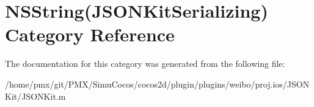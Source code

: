\hypertarget{categoryNSString_07JSONKitSerializing_08}{}\section{N\+S\+String(J\+S\+O\+N\+Kit\+Serializing) Category Reference}
\label{categoryNSString_07JSONKitSerializing_08}


The documentation for this category was generated from the following file\+:\begin{DoxyCompactItemize}
\item 
/home/pmx/git/\+P\+M\+X/\+Simu\+Cocos/cocos2d/plugin/plugins/weibo/proj.\+ios/\+J\+S\+O\+N\+Kit/J\+S\+O\+N\+Kit.\+m\end{DoxyCompactItemize}
